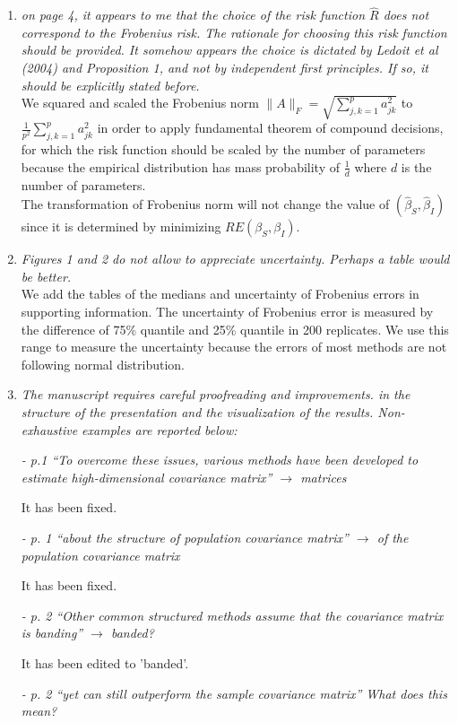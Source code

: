 \documentclass[12pt]{article}
\begin{document}
\begin{enumerate}
\item \emph{on page 4, it appears to me that the choice of the risk function $\hat{R}$ does not correspond to the Frobenius risk. The rationale for choosing this risk function should be provided. It somehow appears the choice is dictated by Ledoit et al (2004) and Proposition 1, and not by independent first principles. If so, it should be explicitly stated before.}\\
We squared and scaled the Frobenius norm $\|A\|_F = \sqrt{\sum_{j,k=1}^pa_{jk}^2}$ to $\frac{1}{p^2}\sum_{j,k=1}^p a_{jk}^2$ in order to apply fundamental theorem of compound decisions, for which the risk function should be scaled by the number of parameters because the empirical distribution has mass probability of $\frac{1}{d}$ where $d$ is the number of parameters.\\
The transformation of Frobenius norm will not change the value of $(\widehat{\beta}_S,\widehat{\beta}_I)$ since it is determined by minimizing $RE(\beta_S,\beta_I)$.
\item \emph{Figures 1 and 2 do not allow to appreciate uncertainty. Perhaps a table would be better.}\\
We add the tables of the medians and uncertainty of Frobenius errors in supporting information. The uncertainty of Frobenius error is measured by the difference of 75\% quantile and 25\% quantile in 200 replicates. We use this range to measure the uncertainty because the errors of most methods are not following normal distribution. 
\item \emph{The manuscript requires careful proofreading and improvements. in the structure of the presentation and the visualization of the results. Non-exhaustive examples are reported below:}

\emph{- p.1 “To overcome these issues, various methods have been developed to estimate high-dimensional covariance matrix” $\to$ matrices}

It has been fixed.

\emph{- p. 1 “about the structure of population covariance matrix” $\to$ of the population covariance matrix}

It has been fixed.

\emph{- p. 2 “Other common structured methods assume that the covariance matrix is banding” $\to$ banded?}

It has been edited to 'banded'.

\emph{- p. 2 “yet can still outperform the sample covariance matrix” What does this mean?}


\end{enumerate}
\end{document}
